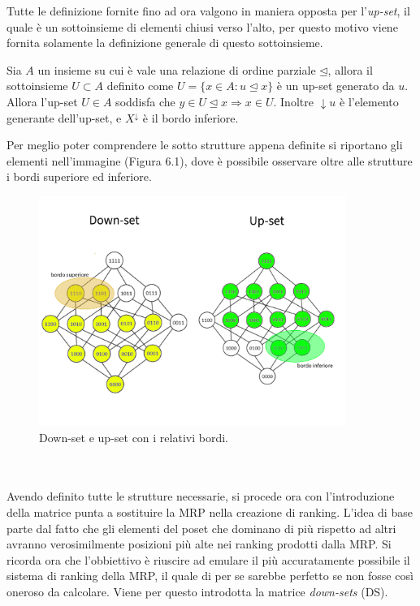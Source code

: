 \documentclass{report}
\begin{document}
Tutte le definizione fornite fino ad ora valgono in maniera opposta per l'\textit{up-set}, il quale è un sottoinsieme di elementi chiusi verso l’alto, per questo motivo viene fornita solamente la definizione generale di questo sottoinsieme.

\begin{definition}[Up-set]
Sia $A$ un insieme su cui è vale una relazione di ordine parziale $\unlhd$, allora il sottoinsieme $U \subset A$ definito come $U=\{x\in A:u\unlhd x\}$ è un up-set generato da $u$.\\
Allora l'up-set $U \in A$ soddisfa che $y\in U\unlhd x\Rightarrow x\in U$.
Inoltre $\downarrow u$ è l'elemento generante dell'up-set, e $X^{\downarrow}$ è il bordo inferiore.
\end{definition}

Per meglio poter comprendere le sotto strutture appena definite si riportano gli elementi nell'immagine (Figura 6.1), dove è possibile osservare oltre alle strutture i bordi superiore ed inferiore.

\begin{figure}[H]
    \centering
    \includegraphics[width=10cm]{IMAGES/poset_14.png}
    \caption{Down-set e up-set con i relativi bordi.}
    \label{fig:roc}
\end{figure}
\\~\\
Avendo definito tutte le strutture necessarie, si procede ora con l'introduzione della matrice punta a sostituire la MRP nella creazione di ranking. L'idea di base parte dal fatto che gli elementi del poset che dominano di più rispetto ad altri avranno verosimilmente posizioni più alte nei ranking prodotti dalla MRP. Si ricorda ora che l'obbiettivo è riuscire ad emulare il più accuratamente possibile il sistema di ranking della MRP, il quale di per se sarebbe perfetto se non fosse così oneroso da calcolare. Viene per questo introdotta la matrice \textit{down-sets} (DS).
\end{document}
